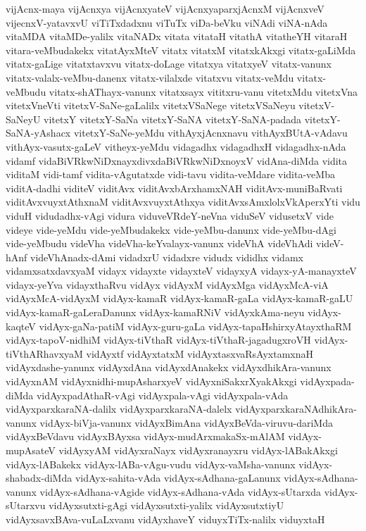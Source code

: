{vijAcnx-maya
vijAcnxya
vijAcnxyateV
vijAcnxyaparxjAcnxM
vijAcnxveV
vijecnxV-yatavxvU
viTiTxdadxnu
viTuTx
viDa-beVku
viNAdi
viNA-nAda
vitaMDA
vitaMDe-yalilx
vitaNADx
vitata
vitataH
vitathA
vitatheYH
vitaraH
vitara-veMbudakekx
vitatAyxMteV
vitatx
vitatxM
vitatxkAkxgi
vitatx-gaLiMda
vitatx-gaLige
vitatxtavxvu
vitatx-doLage
vitatxya
vitatxyeV
vitatx-vanunx
vitatx-valalx-veMbu-danenx
vitatx-vilalxde
vitatxvu
vitatx-veMdu
vitatx-veMbudu
vitatx-shAThayx-vanunx
vitatxsayx
vititxru-vanu
vitetxMdu
vitetxVna
vitetxVneVti
vitetxV-SaNe-gaLalilx
vitetxVSaNege
vitetxVSaNeyu
vitetxV-SaNeyU
vitetxY
vitetxY-SaNa
vitetxY-SaNA
vitetxY-SaNA-padada
vitetxY-SaNA-yAshacx
vitetxY-SaNe-yeMdu
vithAyxjAcnxnavu
vithAyxBUtA-vAdavu
vithAyx-vasutx-gaLeV
vitheyx-yeMdu
vidagadhx
vidagadhxH
vidagadhx-nAda
vidamf
vidaBiVRkwNiDxnayxdivxdaBiVRkwNiDxnoyxV
vidAna-diMda
vidita
viditaM
vidi-tamf
vidita-vAgutatxde
vidi-tavu
vidita-veMdare
vidita-veMba
viditA-dadhi
viditeV
viditAvx
viditAvxbArxhamxNAH
viditAvx-muniBaRvati
viditAvxvuyxtAthxnaM
viditAvxvuyxtAthxya
viditAvxsAmxlolxVkAperxYti
vidu
viduH
vidudadhx-vAgi
vidura
viduveVRdeY-neVna
viduSeV
vidusetxV
vide
videye
vide-yeMdu
vide-yeMbudakekx
vide-yeMbu-danunx
vide-yeMbu-dAgi
vide-yeMbudu
videVha
videVha-keYvalayx-vanunx
videVhA
videVhAdi
videV-hAnf
videVhAnadx-dAmi
vidadxrU
vidadxre
vidudx
vididhx
vidamx
vidamxsatxdavxyaM
vidayx
vidayxte
vidayxteV
vidayxyA
vidayx-yA-manayxteV
vidayx-yeYva
vidayxthaRvu
vidAyx
vidAyxM
vidAyxMga
vidAyxMcA-viA
vidAyxMcA-vidAyxM
vidAyx-kamaR
vidAyx-kamaR-gaLa
vidAyx-kamaR-gaLU
vidAyx-kamaR-gaLeraDanunx
vidAyx-kamaRNiV
vidAyxkAma-neyu
vidAyx-kaqteV
vidAyx-gaNa-patiM
vidAyx-guru-gaLa
vidAyx-tapaHshirxyAtayxthaRM
vidAyx-tapoV-nidhiM
vidAyx-tiVthaR
vidAyx-tiVthaR-jagadugxroVH
vidAyx-tiVthARhavxyaM
vidAyxtf
vidAyxtatxM
vidAyxtasxvaRsAyxtamxnaH
vidAyxdashe-yanunx
vidAyxdAna
vidAyxdAnakekx
vidAyxdhikAra-vanunx
vidAyxnAM
vidAyxnidhi-mupAsharxyeV
vidAyxniSakxrXyakAkxgi
vidAyxpada-diMda
vidAyxpadAthaR-vAgi
vidAyxpala-vAgi
vidAyxpala-vAda
vidAyxparxkaraNA-dalilx
vidAyxparxkaraNA-dalelx
vidAyxparxkaraNAdhikAra-vanunx
vidAyx-biVja-vanunx
vidAyxBimAna
vidAyxBeVda-viruvu-dariMda
vidAyxBeVdavu
vidAyxBAyxsa
vidAyx-mudArxmakaSx-mAlAM
vidAyx-mupAsateV
vidAyxyAM
vidAyxraNayx
vidAyxranayxru
vidAyx-lABakAkxgi
vidAyx-lABakekx
vidAyx-lABa-vAgu-vudu
vidAyx-vaMsha-vanunx
vidAyx-shabadx-diMda
vidAyx-sahita-vAda
vidAyx-sAdhana-gaLanunx
vidAyx-sAdhana-vanunx
vidAyx-sAdhana-vAgide
vidAyx-sAdhana-vAda
vidAyx-sUtarxda
vidAyx-sUtarxvu
vidAyxsutxti-gAgi
vidAyxsutxti-yalilx
vidAyxsutxtiyU
vidAyxsavxBAva-vuLaLxvanu
vidAyxhaveY
viduyxTiTx-nalilx
viduyxtaH
}
